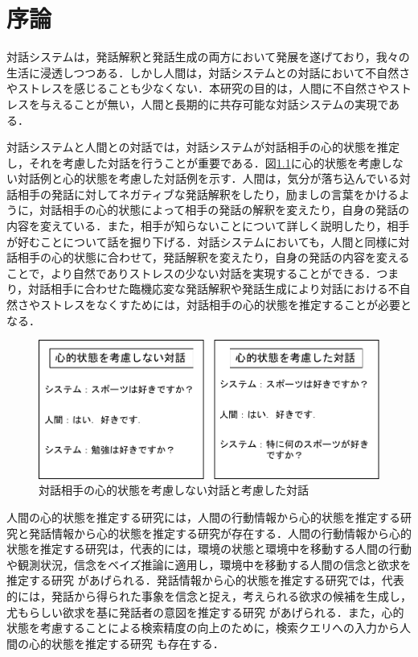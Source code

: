\chapter{序論}

\par
対話システムは，発話解釈と発話生成の両方において発展を遂げており，我々の生活に浸透しつつある．しかし人間は，対話システムとの対話において不自然さやストレスを感じることも少なくない．本研究の目的は，人間に不自然さやストレスを与えることが無い，人間と長期的に共存可能な対話システムの実現である．

\par
対話システムと人間との対話では，対話システムが対話相手の心的状態を推定し，それを考慮した対話を行うことが重要である．図\ref{fig:fig1}に心的状態を考慮しない対話例と心的状態を考慮した対話例を示す．人間は，気分が落ち込んでいる対話相手の発話に対してネガティブな発話解釈をしたり，励ましの言葉をかけるように，対話相手の心的状態によって相手の発話の解釈を変えたり，自身の発話の内容を変えている．また，相手が知らないことについて詳しく説明したり，相手が好むことについて話を掘り下げる．対話システムにおいても，人間と同様に対話相手の心的状態に合わせて，発話解釈を変えたり，自身の発話の内容を変えることで，より自然でありストレスの少ない対話を実現することができる．つまり，対話相手に合わせた臨機応変な発話解釈や発話生成により対話における不自然さやストレスをなくすためには，対話相手の心的状態を推定することが必要となる．

\begin{figure}[htbp]
  \begin{center}
    \includegraphics[scale=0.8]{./fig1.pdf}
    \caption{対話相手の心的状態を考慮しない対話と考慮した対話}
    \label{fig:fig1}
  \end{center}
\end{figure}

\par
人間の心的状態を推定する研究には，人間の行動情報から心的状態を推定する研究と発話情報から心的状態を推定する研究が存在する．人間の行動情報から心的状態を推定する研究は，代表的には，環境の状態と環境中を移動する人間の行動や観測状況，信念をベイズ推論に適用し，環境中を移動する人間の信念と欲求を推定する研究 \cite{baker2011bayesian}があげられる．発話情報から心的状態を推定する研究では，代表的には，発話から得られた事象を信念と捉え，考えられる欲求の候補を生成し，尤もらしい欲求を基に発話者の意図を推定する研究 \cite{高橋拓誠2015bdi}があげられる．また，心的状態を考慮することによる検索精度の向上のために，検索クエリへの入力から人間の心的状態を推定する研究 \cite{10.1007/978-3-642-02481-8_4}も存在する．

